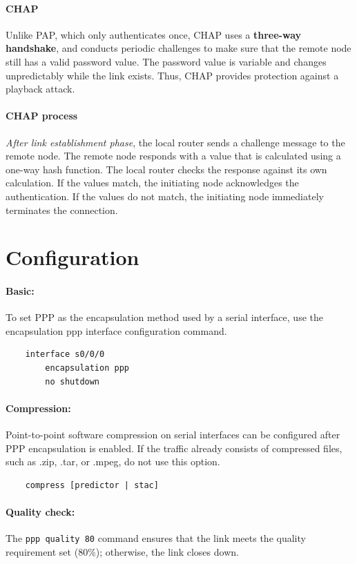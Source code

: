 \paragraph{CHAP}Unlike PAP, which only authenticates once, CHAP uses a \textbf{three-way handshake}, and conducts periodic challenges to make sure that the remote node still has a valid password value. The password value is variable and changes unpredictably while the link exists. Thus, CHAP provides protection against a playback attack.

\paragraph{CHAP process}\emph{After link establishment phase}, the local router sends a challenge message to the remote node. The remote node responds with a value that is calculated using a one-way hash function. The local router checks the response against its own calculation. If the values match, the initiating node acknowledges the authentication. If the values do not match, the initiating node immediately terminates the connection.

\section{Configuration}

\paragraph{Basic:} To set PPP as the encapsulation method used by a serial interface, use the encapsulation ppp interface configuration command.
	\begin{verbatim}
	interface s0/0/0
		encapsulation ppp
		no shutdown
	\end{verbatim}
	
\paragraph{Compression:} Point-to-point software compression on serial interfaces can be configured after PPP encapsulation is enabled. If the traffic already consists of compressed files, such as .zip, .tar, or .mpeg, do not use this option.
	\begin{verbatim}
	compress [predictor | stac]	
	\end{verbatim}
	
\paragraph{Quality check:} The \verb|ppp quality 80| command ensures that the link meets the quality requirement set (80\%); otherwise, the link closes down.


